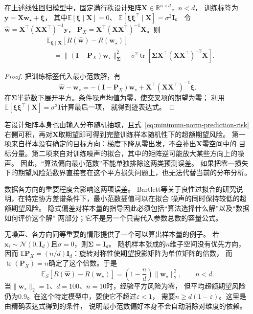 \begin{theorem}[基于最小范数的回归期望风险]
\label{thm:minimum-norm-risk-decomposition}
在上述线性回归模型中，固定满行秩设计矩阵$\bm X\in\mathbb R^{n\times d}$，$n<d$，
训练标签为$\bm y=\bm X\bm w_\star+\bm\xi$，
其中$\mathbb E[\bm\xi\mid\bm X]=0$、
$\mathbb E[\bm\xi\bm\xi^\top\mid\bm X]=\sigma^2\bm I$。
令$\hat{\bm w}=\bm X^\top(\bm X\bm X^\top)^{-1}\bm y$，
$\bm P_X=\bm X^\top(\bm X\bm X^\top)^{-1}\bm X$。则
\begin{equation}
 \begin{aligned}
 &\mathbb E_{\bm\xi\mid\bm X}
       [R(\hat{\bm w})-R(\bm w_\star)]\\
 &\quad=\|(\bm I-\bm P_X)\bm w_\star\|_{\bm\Sigma}^2
 +\sigma^2\operatorname{tr}\left[
 \bm\Sigma\bm X^\top(\bm X\bm X^\top)^{-2}\bm X\right].
 \end{aligned}
 \label{eq:minimum-norm-prediction-risk}
\end{equation}
\end{theorem}
\begin{proof}
把训练标签代入最小范数解，有
\[
 \hat{\bm w}-\bm w_\star
 =-(\bm I-\bm P_X)\bm w_\star
   +\bm X^\top(\bm X\bm X^\top)^{-1}\bm\xi.
\]
在$\bm\Sigma$半范数下展开平方。条件噪声均值为零，使交叉项的期望为零；
利用$\mathbb E[\bm\xi\bm\xi^\top\mid\bm X]=\sigma^2\bm I$计算最后一项，
就得到迹表达式。
\end{proof}

若设计矩阵本身也由输入分布随机抽取，且式~\eqref{eq:minimum-norm-prediction-risk}
右侧可积，再对$\bm X$取期望即可得到完整训练样本随机性下的超额期望风险。
第一项来自样本没有确定的目标方向：梯度下降从零出发，不会补出$\bm X$零空间中的
目标分量。第二项来自对训练噪声的拟合，其中的矩阵逆可能放大某些方向上的噪声。
因此，“算法偏向最小范数”不能单独排除这两类预测误差。
如果把零一损失下的期望风险范数界直接套在这个平方损失问题上，也无法代替当前的分布分析。

数据各方向的重要程度会影响这两项误差。
Bartlett等关于良性过拟合的研究说明，在特定协方差谱条件下，最小范数插值可以在拟合
噪声的同时保持较低的超额期望风险。
隐式偏差对样本量的指导因此必须包括“算法选择什么解”以及“数据如何评价这个解”
两部分；它不是另一个只需代入参数总数的容量公式。

无噪声、各方向同等重要的情形提供了一个可以算出样本量的例子。
若$\bm x_i\sim\mathcal N(0,\bm I_d)$且$\sigma=0$，则$\bm\Sigma=\bm I_d$。
随机样本张成的$n$维子空间没有优先方向，因而
$\mathbb E\bm P_X=(n/d)\bm I_d$：旋转对称性使期望投影矩阵为单位矩阵的倍数，
而$\operatorname{tr}(\bm P_X)=n$确定了这个倍数。于是
\begin{equation}
 \mathbb E_S[R(\hat{\bm w})-R(\bm w_\star)]
 =\left(1-\frac nd\right)\|\bm w_\star\|_2^2,
 \qquad n<d.
 \label{eq:isotropic-minimum-norm-risk}
\end{equation}
当$\|\bm w_\star\|_2=1$、$d=100$、$n=10$时，经验平方风险为零，
但平均超额期望风险仍为0.9。在这个特定模型中，要使它不超过$\varepsilon<1$，
需要$n\geq d(1-\varepsilon)$。这里是由精确表达式得到的条件，
说明最小范数偏好本身不会自动消除对维度的依赖。


